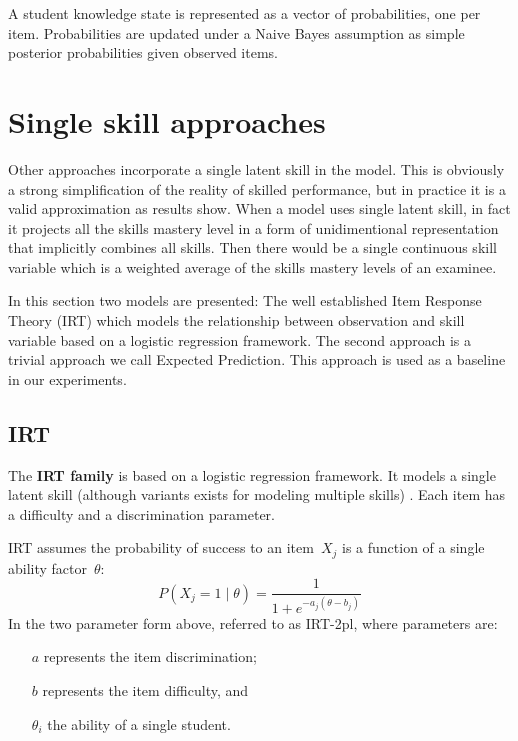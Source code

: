 A student knowledge state is represented as a vector of probabilities, one per item.  Probabilities are updated under a Naive Bayes assumption as simple posterior probabilities given observed items.


\section{Single skill approaches}

Other approaches incorporate a single latent skill in the model. This is obviously a strong simplification of the reality of skilled performance, but in practice it is a valid approximation as results show. When a model uses single latent skill, in fact it projects all the skills mastery level in a form of unidimentional representation that implicitly combines all skills. Then there would be a single continuous skill variable which is a weighted average of the skills mastery levels of an examinee. 

In this section two models are presented: The well established Item Response Theory (IRT) which models the relationship between observation and skill variable based on a logistic regression framework. The second approach is a trivial approach we call Expected Prediction. This approach is used as a baseline in our experiments.

\subsection{IRT} 

The \textbf{IRT family} is based on a logistic regression framework. It models a single latent skill (although variants exists for modeling multiple skills) \cite{bakerKim2004}.  Each item has a difficulty and a discrimination parameter.

IRT assumes the probability of success to an item~$X_j$ is a function of a single ability factor~$\theta$: 
\[P(X_j\!=\!1\;|\;\theta) = \frac{1}{1+e^{-a_j(\theta-b_j)}}\]
In the two parameter form above, referred to as IRT-2pl, where parameters are:

\begin{itemize}
\item[$a$] represents the item discrimination;
\item [$b$] represents the item difficulty, and
\item [$\theta_i$] the ability of a single student.
\end{itemize}

